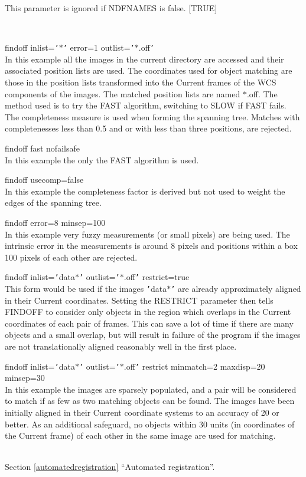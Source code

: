 \documentclass[twoside,11pt]{article}
\newcommand{\htmlref}[2]{#1}
\newcommand{\latexhtml}[2]{#1}
\renewcommand{\_}{\texttt{\symbol{95}}}
\newcommand{\qs}[1]{{\tt '}#1{\tt '}}
\newcommand{\secref}[2]{\latexhtml{Section \ref{#1} ``#2''}{``\htmlref{#2}{#1}''}}
\newcommand{\sstexamples}[1]{
   \item[Examples:] \mbox{} \\
   \vspace{-3.5ex}
   \begin{description}
      #1
   \end{description}
}
\newcommand{\sstexamplesubsection}[2]{\sloppy \item{\ssttt #1} \mbox{} \\ #2 }
\newcommand{\sstnotes}[1]{\item[Notes:] \mbox{} \\[1.3ex] #1}
\newcommand{\sstdiytopic}[2]{\item[#1:] \mbox{} \\[1.3ex] #2}
\newcommand{\sstitemlist}[1]{
  \mbox{} \\
  \vspace{-3.5ex}
  \begin{itemize}
     #1
  \end{itemize}
}
\newcommand{\sstexamples}[1]{
      \item[Examples:] \\
      \begin{description}
         #1
      \end{description}
      \\
   }
\newcommand{\sstexamplesubsection}[2]{\item[{\ssttt #1}] #2}
\newcommand{\sstnotes}[1]{\item[Notes:] #1 }
\newcommand{\sstdiytopic}[2]{\item[{#1:}] #2 }
\newcommand{\sstitemlist}[1]{
      \begin{itemize}
         #1
      \end{itemize}
      \\
   }
\begin{document}
{{{         This parameter is ignored if NDFNAMES is false.
         [TRUE]
      }
   }
   \sstexamples{
      \sstexamplesubsection{
         findoff inlist=\qs{$*$} error=1 outlist=\qs{$*$.off}
      } {
         In this example all the images in the current directory are
         accessed and their associated position lists are used.
         The coordinates used for object matching are those in the
         position lists transformed into the Current frames of the
         WCS components of the images.  The matched position lists are
         named $*$.off.  The method used is to try the FAST algorithm,
         switching to SLOW if FAST fails. The completeness measure
         is used when forming the spanning tree.  Matches with
         completenesses less than 0.5 and or with less than three
         positions, are rejected.
      }
      \sstexamplesubsection{
         findoff fast nofailsafe
      } {
         In this example the only the FAST algorithm is used.
      }
      \sstexamplesubsection{
         findoff usecomp=false
      } {
         In this example the completeness factor is derived but not used
         to weight the edges of the spanning tree.
      }
      \sstexamplesubsection{
         findoff error=8 minsep=100
      }{
         In this example very fuzzy measurements (or small pixels) are
         being used.  The intrinsic error in the measurements is around
         8 pixels and positions within a box 100 pixels of each other
         are rejected.
      }
      \sstexamplesubsection{
         findoff inlist={\tt '}data$*${\tt '} outlist={\tt '}$*$.off{\tt '} restrict=true
      }{
         This form would be used if the images {\tt '}data$*${\tt '} are already
         approximately aligned in their Current coordinates. Setting the
         RESTRICT parameter then tells FINDOFF to consider only objects
         in the region which overlaps in the Current coordinates of
         each pair of frames. This can save a lot of time if there
         are many objects and a small overlap, but will result in
         failure of the program if the images are not translationally
         aligned reasonably well in the first place.
      }
      \sstexamplesubsection{
         findoff inlist={\tt '}data$*${\tt '} outlist={\tt '}$*$.off{\tt '} restrict minmatch=2
              maxdisp=20 minsep=30
      }{
         In this example the images are sparsely populated, and a pair
         will be considered to match if as few as two matching objects
         can be found.  The images have been initially aligned in their
         Current coordinate systems to an accuracy of 20 or better.  As
         an additional safeguard, no objects within 30 units (in
         coordinates of the Current frame) of each other in the same image
         are used for matching.
      }
   }
   \sstdiytopic{
      See also
   } {
      \secref{automatedregistration}{Automated registration}.
   }
   \sstnotes{
      \sstitemlist{

}}}
\end{document}
